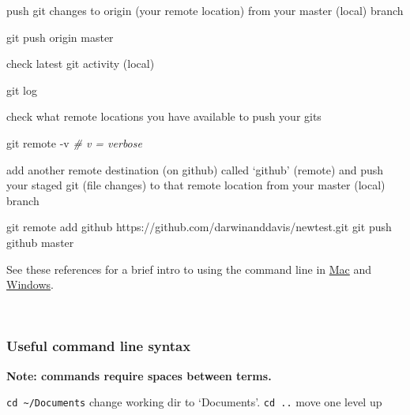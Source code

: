 \documentclass[10,portrait]{article}
\newenvironment{Shaded}{\begin{snugshade}}{\end{snugshade}}
\newcommand{\CommentTok}[1]{\textcolor[rgb]{0.56,0.35,0.01}{\textit{#1}}}
\newcommand{\FunctionTok}[1]{\textcolor[rgb]{0.00,0.00,0.00}{#1}}
\newcommand{\NormalTok}[1]{#1}
\begin{document}
push git changes to origin (your remote location) from your master
(local) branch

\begin{Shaded}
\begin{Highlighting}[]
\FunctionTok{git}\NormalTok{ push origin master }
\end{Highlighting}
\end{Shaded}

check latest git activity (local)

\begin{Shaded}
\begin{Highlighting}[]
\FunctionTok{git}\NormalTok{ log}
\end{Highlighting}
\end{Shaded}

check what remote locations you have available to push your gits

\begin{Shaded}
\begin{Highlighting}[]
\FunctionTok{git}\NormalTok{ remote -v }\CommentTok{# v = verbose    }
\end{Highlighting}
\end{Shaded}

add another remote destination (on github) called `github' (remote) and
push your staged git (file changes) to that remote location from your
master (local) branch

\begin{Shaded}
\begin{Highlighting}[]
\FunctionTok{git}\NormalTok{ remote add github https://github.com/darwinanddavis/newtest.git }
\FunctionTok{git}\NormalTok{ push github master }
\end{Highlighting}
\end{Shaded}

See these references for a brief intro to using the command line in
\href{https://macpaw.com/how-to/use-terminal-on-mac}{Mac} and
\href{https://www.computerhope.com/issues/chusedos.htm}{Windows}.

~

\subsubsection{Useful command line
syntax}\label{useful-command-line-syntax}

\textbf{Note: commands require spaces between terms.}

\texttt{cd\ \textasciitilde{}/Documents} change working dir to
`Documents'. \texttt{cd\ ..} move one level up
\end{document}
